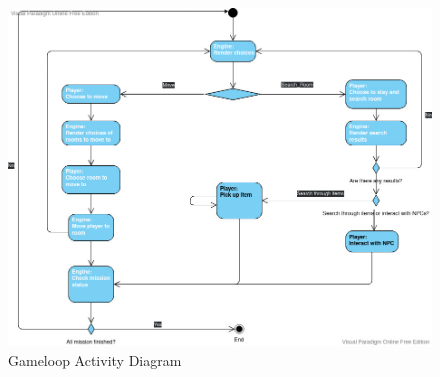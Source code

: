 \documentclass{scrbook}
\begin{document}
\begin{figure}
    \includegraphics[width=1.0\columnwidth]{GameLoop_ActivityDiagram.jpg}
    \caption{Gameloop Activity Diagram}\label{fig:4}
\end{figure}
\end{document}
